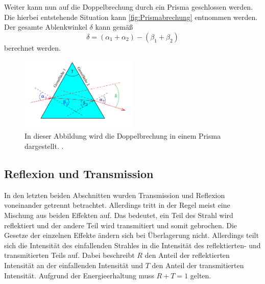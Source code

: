 Weiter kann nun auf die Doppelbrechung durch ein Prisma geschlossen werden. Die hierbei entstehende Situation kann \autoref{fig:Prismabrechung} entnommen werden.
Der gesamte Ablenkwinkel $\delta$ kann gemäß 
\begin{equation}
  \label{eqn:delta}
  \delta = (\alpha_1 + \alpha_2) - (\beta_1 + \beta_2)
\end{equation}
berechnet werden.

\begin{figure}
  \centering
  \includegraphics[width=0.5\textwidth]{content/Prismabrechung.png}
  \caption{In dieser Abbildung wird die Doppelbrechung in einem Prisma dargestellt. \cite{v400}.}
  \label{fig:Prismabrechung}
\end{figure}

\subsection{Reflexion und Transmission}
\label{subsec:ReUTra}
In den letzten beiden Abschnitten wurden Transmission und Reflexion voneinander getrennt betrachtet. Allerdings tritt in der Regel meist eine Mischung aus beiden Effekten
auf. Das bedeutet, ein Teil des Strahl wird reflektiert und der andere Teil wird transmitiert und somit gebrochen. Die Gesetze der einzelnen Effekte ändern sich bei Überlagerung
nicht. Allerdings teilt sich die Intensität des einfallenden Strahles in die Intensität des reflektierten- und transmitierten Teils auf. Dabei beschreibt $R$ den Anteil der 
reflektierten Intensität an der einfallenden Intensität und $T$ den Anteil der transmitierten Intensität. Aufgrund der Energieerhaltung muss $R + T = 1$ gelten.

